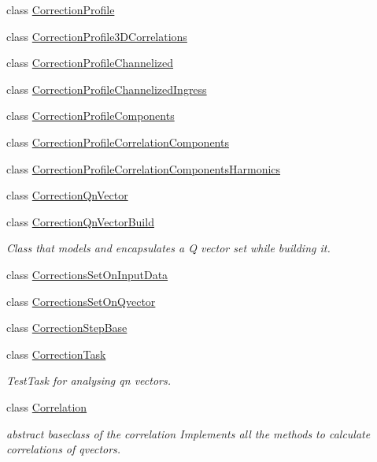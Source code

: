 \begin{DoxyCompactItemize}
class \mbox{\hyperlink{classQn_1_1CorrectionProfile}{Correction\+Profile}}
\item 
class \mbox{\hyperlink{classQn_1_1CorrectionProfile3DCorrelations}{Correction\+Profile3\+D\+Correlations}}
\item 
class \mbox{\hyperlink{classQn_1_1CorrectionProfileChannelized}{Correction\+Profile\+Channelized}}
\item 
class \mbox{\hyperlink{classQn_1_1CorrectionProfileChannelizedIngress}{Correction\+Profile\+Channelized\+Ingress}}
\item 
class \mbox{\hyperlink{classQn_1_1CorrectionProfileComponents}{Correction\+Profile\+Components}}
\item 
class \mbox{\hyperlink{classQn_1_1CorrectionProfileCorrelationComponents}{Correction\+Profile\+Correlation\+Components}}
\item 
class \mbox{\hyperlink{classQn_1_1CorrectionProfileCorrelationComponentsHarmonics}{Correction\+Profile\+Correlation\+Components\+Harmonics}}
\item 
class \mbox{\hyperlink{classQn_1_1CorrectionQnVector}{Correction\+Qn\+Vector}}
\item 
class \mbox{\hyperlink{classQn_1_1CorrectionQnVectorBuild}{Correction\+Qn\+Vector\+Build}}
\begin{DoxyCompactList}\small\item\em Class that models and encapsulates a Q vector set while building it. \end{DoxyCompactList}\item 
class \mbox{\hyperlink{classQn_1_1CorrectionsSetOnInputData}{Corrections\+Set\+On\+Input\+Data}}
\item 
class \mbox{\hyperlink{classQn_1_1CorrectionsSetOnQvector}{Corrections\+Set\+On\+Qvector}}
\item 
class \mbox{\hyperlink{classQn_1_1CorrectionStepBase}{Correction\+Step\+Base}}
\item 
class \mbox{\hyperlink{classQn_1_1CorrectionTask}{Correction\+Task}}
\begin{DoxyCompactList}\small\item\em Test\+Task for analysing qn vectors. \end{DoxyCompactList}\item 
class \mbox{\hyperlink{classQn_1_1Correlation}{Correlation}}
\begin{DoxyCompactList}\small\item\em abstract baseclass of the correlation Implements all the methods to calculate correlations of qvectors. \end{DoxyCompactList}\item 

\end{DoxyCompactItemize}
